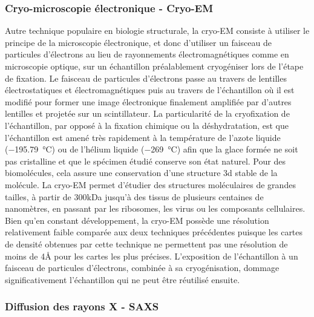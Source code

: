 \subsubsection{Cryo-microscopie électronique - Cryo-EM}

Autre technique populaire en biologie structurale, la cryo-EM consiste à utiliser le principe de la microscopie électronique, et donc d'utiliser un faisceau de particules d'électrons au lieu de rayonnements électromagnétiques comme en microscopie optique, sur un échantillon préalablement cryogéniser lors de l'étape de fixation. Le faisceau de particules d'électrons passe au travers de lentilles électrostatiques et électromagnétiques puis au travers de l'échantillon où il est modifié pour former une image électronique finalement amplifiée par d'autres lentilles et projetée sur un scintillateur. 
La particularité de la cryofixation de l'échantillon, par opposé à la fixation chimique ou la déshydratation, est que l'échantillon est amené très rapidement à la température de l'azote liquide (\SI{-195.79}{\degreeCelsius}) ou de l'hélium liquide (\SI{-269}{\degreeCelsius}) afin que la glace formée ne soit pas cristalline et que le spécimen étudié conserve son état naturel. Pour des biomolécules, cela assure une conservation d'une structure 3d stable de la molécule. La cryo-EM permet d'étudier des structures moléculaires de grandes tailles, à partir de 300kDa jusqu'à des tissus de plusieurs centaines de nanomètres, en passant par les ribosomes, les virus ou les composants cellulaires.
Bien qu'en constant développement, la cryo-EM possède une résolution relativement faible comparée aux deux techniques précédentes puisque les cartes de densité obtenues par cette technique ne permettent pas une résolution de moins de 4\r{A} pour les cartes les plus précises\cite{zhou_atomic_2011}. L'exposition de l'échantillon à un faisceau de particules d'électrons, combinée à sa cryogénisation, dommage significativement l'échantillon qui ne peut être réutilisé ensuite.

\subsubsection{Diffusion des rayons X - SAXS}

